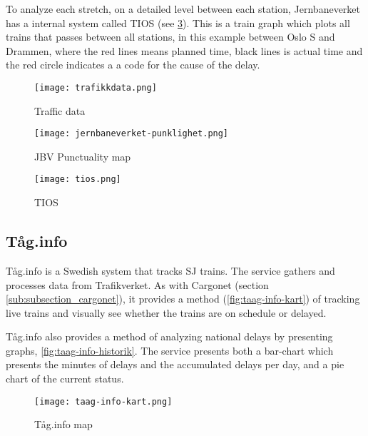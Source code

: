 To analyze each stretch, on a detailed level between each station,
Jernbaneverket has a internal system called TIOS (see \ref{fig:jernbaneverket-tios}).
This is a train graph which plots all trains that passes between all stations,
in this example between Oslo S and Drammen, where the red lines means planned
time, black lines is actual time and the red circle indicates a a code for the cause of the delay. 

\begin{figure}[!htbp]
	\texttt{[image: trafikkdata.png]}
	\caption[Traffic data]{Traffic data	\cite{sintefPresis}}
	\label{fig:jernbaneverket-trafikkdata}
\end{figure}
\pagebreak

\begin{figure}[!htbp]
	\texttt{[image: jernbaneverket-punklighet.png]}
	\caption[JBV Punctuality map]{JBV Punctuality map \cite{jernbaneverketPunklighetKart}}
	\label{fig:jernbaneverket-punklighet}
\end{figure}
\pagebreak

\begin{figure}[!htbp]
	\texttt{[image: tios.png]}
	\caption[TIOS]{TIOS\cite{jernbaneverketPunklighetKart}}
	\label{fig:jernbaneverket-tios}
\end{figure}
\pagebreak


\clearpage
\subsection{Tåg.info}
\label{sub:subsection_taag.info}

Tåg.info\cite{taagInfo} is a Swedish system that tracks SJ\cite{svenskaJernban} trains. The
service gathers and processes data from Trafikverket\cite{trafikverket}. As
with Cargonet (section \vref{sub:subsection_cargonet}), it provides a method (\vref{fig:taag-info-kart}) of
tracking live trains and visually see whether the trains are on schedule or
delayed. 

Tåg.info also provides a method of analyzing national delays by presenting
graphs, \vref{fig:taag-info-historik}. The service presents both a bar-chart
which presents the minutes of delays and the accumulated delays per day, and a
pie chart of the current status.

\begin{figure}[!htbp]
	\texttt{[image: taag-info-kart.png]}
	\caption[Tåg.info map]{Tåg.info map
	\cite{taagInfo}}
	\label{fig:taag-info-kart}
\end{figure}
\pagebreak

